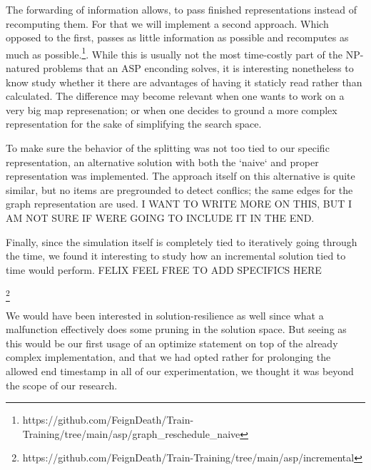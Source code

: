 The forwarding of information allows, to pass finished representations instead of recomputing them. For that we will implement a second approach. Which opposed to the first, passes as little information as possible and recomputes as much as possible.\footnote{https://github.com/FeignDeath/Train-Training/tree/main/asp/graph\_reschedule\_naive}. While this is usually not the most time-costly part of the NP-natured problems that an ASP enconding solves, it is interesting nonetheless to know study whether it there are advantages of having it staticly read rather than calculated. The difference may become relevant when one wants to work on a very big map represenation; or when one decides to ground a more complex representation for the sake of simplifying the search space.





To make sure the behavior of the splitting was not too tied to our specific representation, an alternative solution with both the `naive` and proper representation was implemented. The approach itself on this alternative is quite similar, but no items are pregrounded to detect conflics; the same edges for the graph representation are used. 
\color{red}
I WANT TO WRITE MORE ON THIS, BUT I AM NOT SURE IF WERE GOING TO INCLUDE IT IN THE END.
\color{black}


Finally, since the simulation itself is completely tied to iteratively going through the time, we found it interesting to study how an incremental solution tied to time would perform. 
\color{red}FELIX FEEL FREE TO ADD SPECIFICS HERE
\color{black} 

\footnote{https://github.com/FeignDeath/Train-Training/tree/main/asp/incremental}

We would have been interested in solution-resilience as well since what a malfunction effectively does some pruning in the solution space. But seeing as this would be our first usage of an optimize statement on top of the already complex implementation, and that we had opted rather for prolonging the allowed end timestamp in all of our experimentation, we thought it was beyond the scope of our research.



